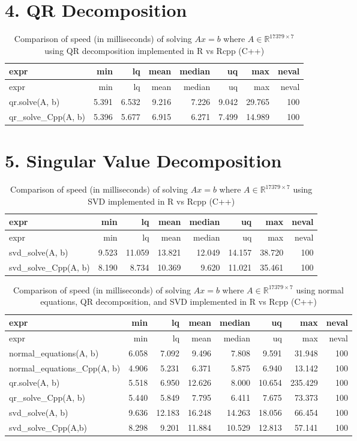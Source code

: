\documentclass[
]{article}
\begin{document}
\hypertarget{qr-decomposition}{%
\section{4. QR Decomposition}\label{qr-decomposition}}

\begin{longtable}[]{@{}lrrrrrrr@{}}
\caption{Comparison of speed (in milliseconds) of solving \(Ax = b\)
where \(A \in \mathbb{R}^{17379 \times 7}\) using QR decomposition
implemented in R vs Rcpp (C++)}\tabularnewline
\toprule
expr & min & lq & mean & median & uq & max & neval\tabularnewline
\midrule
\endfirsthead
\toprule
expr & min & lq & mean & median & uq & max & neval\tabularnewline
\midrule
\endhead
qr.solve(A, b) & 5.391 & 6.532 & 9.216 & 7.226 & 9.042 & 29.765 &
100\tabularnewline
qr\_solve\_Cpp(A, b) & 5.396 & 5.677 & 6.915 & 6.271 & 7.499 & 14.989 &
100\tabularnewline
\bottomrule
\end{longtable}

\hypertarget{singular-value-decomposition}{%
\section{5. Singular Value
Decomposition}\label{singular-value-decomposition}}

\begin{longtable}[]{@{}lrrrrrrr@{}}
\caption{Comparison of speed (in milliseconds) of solving \(Ax = b\)
where \(A \in \mathbb{R}^{17379 \times 7}\) using SVD implemented in R
vs Rcpp (C++)}\tabularnewline
\toprule
expr & min & lq & mean & median & uq & max & neval\tabularnewline
\midrule
\endfirsthead
\toprule
expr & min & lq & mean & median & uq & max & neval\tabularnewline
\midrule
\endhead
svd\_solve(A, b) & 9.523 & 11.059 & 13.821 & 12.049 & 14.157 & 38.720 &
100\tabularnewline
svd\_solve\_Cpp(A, b) & 8.190 & 8.734 & 10.369 & 9.620 & 11.021 & 35.461
& 100\tabularnewline
\bottomrule
\end{longtable}

\begin{longtable}[]{@{}lrrrrrrr@{}}
\caption{Comparison of speed (in milliseconds) of solving \(Ax = b\)
where \(A \in \mathbb{R}^{17379 \times 7}\) using normal equations, QR
decomposition, and SVD implemented in R vs Rcpp (C++)}\tabularnewline
\toprule
expr & min & lq & mean & median & uq & max & neval\tabularnewline
\midrule
\endfirsthead
\toprule
expr & min & lq & mean & median & uq & max & neval\tabularnewline
\midrule
\endhead
normal\_equations(A, b) & 6.058 & 7.092 & 9.496 & 7.808 & 9.591 & 31.948
& 100\tabularnewline
normal\_equations\_Cpp(A, b) & 4.906 & 5.231 & 6.371 & 5.875 & 6.940 &
13.142 & 100\tabularnewline
qr.solve(A, b) & 5.518 & 6.950 & 12.626 & 8.000 & 10.654 & 235.429 &
100\tabularnewline
qr\_solve\_Cpp(A, b) & 5.440 & 5.849 & 7.795 & 6.411 & 7.675 & 73.373 &
100\tabularnewline
svd\_solve(A, b) & 9.636 & 12.183 & 16.248 & 14.263 & 18.056 & 66.454 &
100\tabularnewline
svd\_solve\_Cpp(A,b) & 8.298 & 9.201 & 11.884 & 10.529 & 12.813 & 57.141
& 100\tabularnewline
\bottomrule
\end{longtable}
\end{document}
